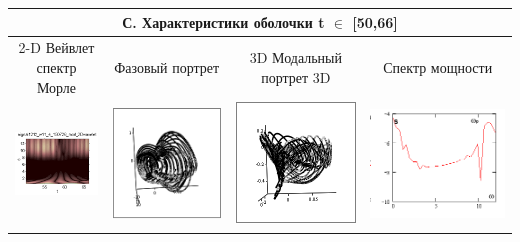 \documentclass[12pt,letterpaper]{extreport}
\begin{document}
\begin{table}[H]
{\begin{tabular}{|c|c|c|c|}
\multicolumn{4}{|c|}{С. Характеристики оболочки  t 
$\in$ [50,66]}\\

\hline
\footnotesize 2-D Вейвлет спектр Морле&
\footnotesize Фазовый 
портрет&\footnotesize 3D Модальный портрет 3D&
\footnotesize Спектр мощности\\
\hline
	\includegraphics[scale=1]{c1} 	
	&	
	\includegraphics[scale=0.9]{c2} 	
	&	
	\includegraphics[scale=0.9]{c3} 
	&
	\includegraphics[scale=0.9]{c4} 
\\
\hline


\end{tabular}}
\end{table}
\end{document}
